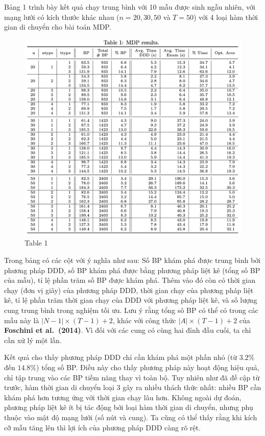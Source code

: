 \documentclass[../main.tex]{subfiles}
\begin{document}
Bảng 1 trình bày kết quả chạy trung bình với 10 mẫu được sinh ngẫu
nhiên, với mạng lưới có kích thước khác nhau (\(n=20,30,50\) và
\(T=50\)) với 4 loại hàm thời gian di chuyển cho bài toán MDP.

\begin{figure}
\centering
\includegraphics{images/Table1.png}
\caption{Table 1}
\end{figure}

Trong bảng có các cột với ý nghĩa như sau: Số BP khám phá được trung
bình bởi phương pháp DDD, số BP khám phá được bằng phương pháp liệt kê
(tổng số BP của mẫu), tỉ lệ phần trăm số BP được khám phá. Thêm vào đó
còn có thời gian chạy (đơn vị giây) của phương pháp DDD, thời gian chạy
của phương pháp liệt kê, tỉ lệ phần trăm thời gian chạy của DDD với
phương pháp liệt kê, và số lượng cung trung bình trong nghiệm tối ưu.
Lưu ý rằng tổng sô BP có thể có trong các mẫu này là
\(|N − 1| \times (T − 1) + 2\), khác với công thức
\(|A| \times (T − 1) + 2\) của \textbf{Foschini et al.~(2014)}. Vì đối
với các cung có cùng hai đỉnh đầu cuối, ta chỉ cần xử lý một lần.

Kết quả cho thấy phương pháp DDD chỉ cần khám phá một phần nhỏ (từ
\(3.2\%\) đến \(14.8\%\)) tổng số BP. Điều này cho thấy phương pháp này
hoạt động hiệu quả, chỉ tập trung vào các BP tiềm năng thay vì toàn bộ.
Tuy nhiên như đã đề cập từ trước, hàm thời gian di chuyển loại 3 gây ra
nhiều thách thức nhất: nhiều BP cần khám phá hơn tương ứng với thời gian
chạy lâu hơn. Không ngoài dự đoán, phương pháp liệt kê ít bị tác động
bởi loại hàm thời gian di chuyển, nhưng phụ thuộc vào mật độ mạng lưới
(số nút và cung). Ta cũng có thể thấy rằng khi kích cỡ mẫu tăng lên thì
lợi ích của phương pháp DDD càng rõ rệt.
\end{document}
